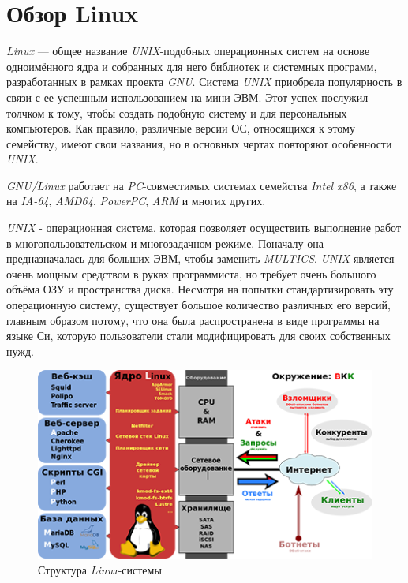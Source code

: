 \section{Обзор Linux}
\textit{Linux} — общее название \textit{UNIX}-подобных операционных систем на основе одноимённого ядра и собранных для него библиотек и системных программ, разработанных в рамках проекта \textit{GNU}.
Система \textit{UNIX} приобрела популярность в связи с ее успешным использованием на мини-ЭВМ. Этот успех послужил толчком к тому, чтобы создать подобную систему и для персональных компьютеров. Как правило, различные версии ОС, относящихся к этому семейству, имеют свои названия, но в основных чертах повторяют особенности \textit{UNIX}.

\textit{GNU/Linux} работает на \textit{PC}-совместимых системах семейства \textit{Intel x86}, а также на \textit{IA-64}, \textit{AMD64}, \textit{PowerPC}, \textit{ARM} и многих других.

\textit{UNIX} - операционная система, которая позволяет осуществить выполнение работ в многопользовательском и многозадачном режиме. Поначалу она предназначалась для больших ЭВМ, чтобы заменить \textit{MULTICS}. \textit{UNIX} является очень мощным средством в руках программиста, но требует очень большого объёма ОЗУ и пространства диска. Несмотря на попытки стандартизировать эту операционную систему, существует большое количество различных его версий, главным образом потому, что она была распространена в виде программы на языке Си, которую пользователи стали модифицировать для своих собственных нужд.

\begin{figure}[!h]
	\begin{center}
	\includegraphics[width=\textwidth]{figures/LAMP_software_bundle.png}
	\end{center}
	\caption{Структура \textit{Linux}-системы}
\end{figure}

